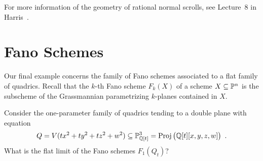 For more information of the geometry of rational normal scrolls, see
Lecture~8 in Harris~\cite{SC:H}.


\section{Fano Schemes}

Our final example concerns the family of Fano schemes associated to a flat family of quadrics.
Recall that the $k$-th Fano scheme $F_{k}(X)$ of a
scheme $X \subseteq {\mathbb P}^{n}$ is the subscheme of
the Grassmannian parametrizing $k$-planes
contained in $X$.

\begin{problem*}
Consider the one-parameter family of
quadrics tending to a double plane with equation
\[ 
Q = V(tx^{2}+ty^{2}+tz^{2}+w^{2}) \subseteq {\mathbb P}^{3}_{{\mathbb Q}[t]} =
\operatorname{Proj}\big({\mathbb Q}[t][x,y,z,w]\big) \enspace .
\]
What is the flat limit of the Fano schemes
$F_{1}(Q_{t})$?
\end{problem*}

